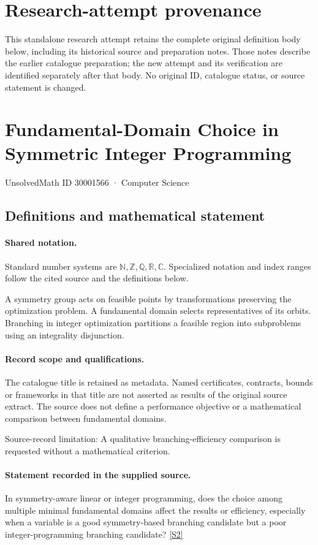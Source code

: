 \documentclass[11pt]{article}
\begin{document}
\section*{Research-attempt provenance}
This standalone research attempt retains the complete original definition body below,
including its historical source and preparation notes. Those notes describe the
earlier catalogue preparation; the new attempt and its verification are identified
separately after that body. No original ID, catalogue status, or source statement is changed.

\section{Fundamental-Domain Choice in Symmetric Integer Programming}\label{30001566}
{\small UnsolvedMath ID 30001566 · Computer Science}
\subsection{Definitions and mathematical statement}

\paragraph{Shared notation.}Standard number systems are $\mathbb N,\mathbb Z,\mathbb Q,\mathbb R,\mathbb C$. Specialized notation and index ranges follow the cited source and the definitions below.


A symmetry group acts on feasible points by transformations preserving the optimization problem. A fundamental domain selects representatives of its orbits. Branching in integer optimization partitions a feasible region into subproblems using an integrality disjunction.
\paragraph{Record scope and qualifications.}
The catalogue title is retained as metadata. Named certificates, contracts, bounds or frameworks in that title are not asserted as results of the original source extract.
The source does not define a performance objective or a mathematical comparison between fundamental domains.

Source-record limitation: A qualitative branching-efficiency comparison is requested without a mathematical criterion.
\paragraph{Statement recorded in the supplied source.}
In symmetry-aware linear or integer programming, does the choice among multiple minimal fundamental domains affect the results or efficiency, especially when a variable is a good symmetry-based branching candidate but a poor integer-programming branching candidate? \href{https://doi.org/10.4171/owr/2010/38}{[S2]}
\end{document}

